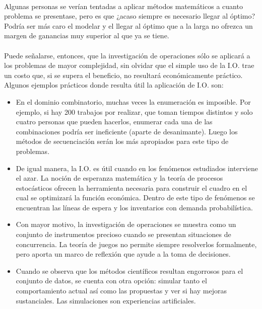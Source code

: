 \documentclass[12pt, a4paper,spanish]{article}
\begin{document}
		\paragraph{}
		Algunas personas se verían tentadas a aplicar métodos matemáticos a cuanto problema se presentase, pero es que ¿acaso siempre es necesario llegar al óptimo? Podría ser más caro el modelar y el llegar al óptimo que a la larga no ofrezca un margen de ganancias muy superior al que ya se tiene.\cite{wikipedia_IO}

		\paragraph{}
		Puede señalarse, entonces, que la investigación de operaciones sólo se aplicará a los problemas de mayor complejidad, sin olvidar que el simple uso de la I.O. trae un costo que, si se supera el beneficio, no resultará económicamente práctico. Algunos ejemplos prácticos donde resulta útil la aplicación de I.O. son:\cite{wikipedia_IO}

		\begin{itemize}

			\item En el dominio combinatorio, muchas veces la enumeración es imposible. Por ejemplo, si hay 200 trabajos por realizar, que toman tiempos distintos y solo cuatro personas que pueden hacerlos, enumerar cada una de las combinaciones podría ser ineficiente (aparte de desanimante). Luego los métodos de secuenciación serán los más apropiados para este tipo de problemas.\cite{wikipedia_IO}

			\item De igual manera, la I.O. es útil cuando en los fenómenos estudiados interviene el azar. La noción de esperanza matemática y la teoría de procesos estocásticos ofrecen la herramienta necesaria para construir el cuadro en el cual se optimizará la función económica. Dentro de este tipo de fenómenos se encuentran las líneas de espera y los inventarios con demanda probabilística.\cite{wikipedia_IO}

			\item Con mayor motivo, la investigación de operaciones se muestra como un conjunto de instrumentos precioso cuando se presentan situaciones de concurrencia. La teoría de juegos no permite siempre resolverlos formalmente, pero aporta un marco de reflexión que ayude a la toma de decisiones.\cite{wikipedia_IO}

			\item Cuando se observa que los métodos científicos resultan engorrosos para el conjunto de datos, se cuenta con otra opción: simular tanto el comportamiento actual así como las propuestas y ver si hay mejoras sustanciales. Las simulaciones son experiencias artificiales.\cite{wikipedia_IO}

		\end{itemize}
\end{document}

